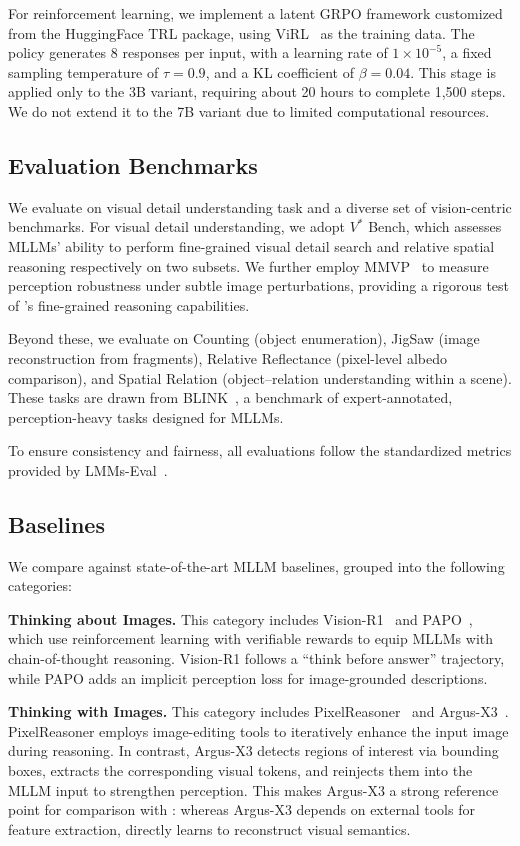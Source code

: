 For reinforcement learning, we implement a latent GRPO framework customized from the HuggingFace TRL package, using ViRL~\citep{vl-rethinker} as the training data. The policy generates 8 responses per input, with a learning rate of $1\times 10^{-5}$, a fixed sampling temperature of $\tau=0.9$, and a KL coefficient of $\beta=0.04$. This stage is applied only to the 3B variant, requiring about 20 hours to complete 1,500 steps. We do not extend it to the 7B variant due to limited computational resources.


\subsection{Evaluation Benchmarks}
We evaluate \modelname on visual detail understanding task and a diverse set of vision-centric benchmarks. For visual detail understanding, we adopt $V^*$ Bench, which assesses MLLMs’ ability to perform fine-grained visual detail search and relative spatial reasoning respectively on two subsets. We further employ MMVP~\citep{mmvp} to measure perception robustness under subtle image perturbations, providing a rigorous test of \modelname’s fine-grained reasoning capabilities.

Beyond these, we evaluate on Counting (object enumeration), JigSaw (image reconstruction from fragments), Relative Reflectance (pixel-level albedo comparison), and Spatial Relation (object–relation understanding within a scene). These tasks are drawn from BLINK~\citep{blink}, a benchmark of expert-annotated, perception-heavy tasks designed for MLLMs.

To ensure consistency and fairness, all evaluations follow the standardized metrics provided by LMMs-Eval~\citep{lmms_eval2024}. 

\subsection{Baselines}
We compare \modelname against state-of-the-art MLLM baselines, grouped into the following categories:

\textbf{Thinking about Images.} This category includes Vision-R1~\citep{visionr1} and PAPO~\citep{papo}, which use reinforcement learning with verifiable rewards to equip MLLMs with chain-of-thought reasoning. Vision-R1 follows a ``think before answer'' trajectory, while PAPO adds an implicit perception loss for image-grounded descriptions.


\textbf{Thinking with Images.} This category includes PixelReasoner~\citep{pixelreasoner} and Argus-X3~\citep{man2025argus}. PixelReasoner employs image-editing tools to iteratively enhance the input image during reasoning. In contrast, Argus-X3 detects regions of interest via bounding boxes, extracts the corresponding visual tokens, and reinjects them into the MLLM input to strengthen perception. This makes Argus-X3 a strong reference point for comparison with \modelname: whereas Argus-X3 depends on external tools for feature extraction, \modelname directly learns to reconstruct visual semantics.

